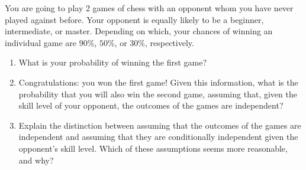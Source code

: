 \documentclass[11pt]{article}
\begin{document}
You are going to play 2 games of chess with an opponent whom you have never played against before. Your opponent is equally likely to be a beginner, intermediate, or master. Depending on which, your chances of winning an individual game are $90\%$, $50\%$, or $30\%$, respectively.

\begin{enumerate}[label=(\alph*), leftmargin=*]
    \item What is your probability of winning the first game?

    \item Congratulations: you won the first game! Given this information, what is the probability that you will also win the second game, assuming that, given the skill level of your opponent, the outcomes of the games are independent?

    \item Explain the distinction between assuming that the outcomes of the games are independent and assuming that they are conditionally independent given the opponent's skill level. Which of these assumptions seems more reasonable, and why?
\end{enumerate}
\end{document}
